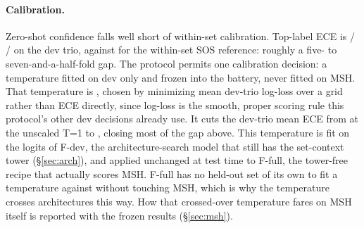 \paragraph{Calibration.}
Zero-shot confidence falls well short of within-set calibration. Top-label
ECE is \FdevBroEce{} / \FdevTmtEce{} / \FdevSosEce{} on the dev trio,
against \CeilSosEce{} for the within-set SOS reference: roughly a five- to
seven-and-a-half-fold gap. The protocol permits one calibration decision: a
temperature fitted on dev only and frozen into the battery, never fitted
on MSH. That temperature is \FrozenTemperature, chosen by minimizing mean
dev-trio log-loss over a grid rather than ECE directly, since log-loss is
the smooth, proper scoring rule this protocol's other dev decisions
already use. It cuts the dev-trio mean ECE from \DevMeanEceAtTOne{} at the
unscaled T=1 to \DevMeanEceAtFrozenT{}, closing most of the gap above.
This temperature is fit on the logits of F-dev, the architecture-search
model that still has the set-context tower (\S\ref{sec:arch}), and applied
unchanged at test time to F-full, the tower-free recipe that actually
scores MSH. F-full has no held-out set of its own to fit a temperature
against without touching MSH, which is why the temperature crosses
architectures this way. How that crossed-over temperature fares on MSH
itself is reported with the frozen results (\S\ref{sec:msh}).

